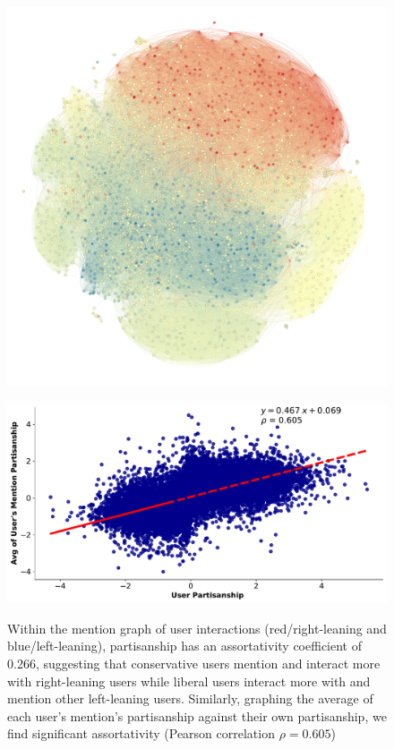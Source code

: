 \begin{figure}
\begin{minipage}{.33\textwidth}
  \centering
  \includegraphics[width=1\linewidth]{figures/republican-democratic-graph.png}
\label{fig:twitter-reddit-partisanship-time}
\end{minipage}%
\begin{minipage}{.6\textwidth}
  \centering
  \includegraphics[width=1\linewidth]{figures/ideology_vs_avg_mention-20240429.pdf}
\label{fig:twitter-reddit-partisanship-time2}
\end{minipage}%

\begin{minipage}{1\textwidth}
\caption{Within the mention graph of user interactions (red/right-leaning and blue/left-leaning), partisanship has an assortativity coefficient of 0.266, suggesting that conservative users mention and interact more with right-leaning users while liberal users interact more with and mention other left-leaning users. Similarly, graphing the average of each user's mention's partisanship against their own partisanship, we find significant assortativity (Pearson correlation $\rho=0.605$)\label{fig:graph-of-political-interactions}
}
\end{minipage}

\end{figure}
